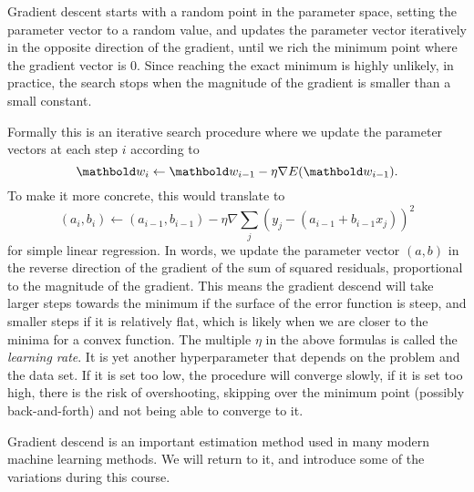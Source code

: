 Gradient descent starts with a random point in the parameter space,
setting the parameter vector to a random value,
and updates the parameter vector iteratively 
in the opposite direction of the gradient,
until we rich the minimum point where the gradient vector is \num{0}.
Since reaching the exact minimum is highly unlikely,
in practice, the search stops when the magnitude of the gradient is 
smaller than a small constant.

Formally this is an iterative search procedure where
we update the parameter vectors at each step $i$ according to 
\begin{equation}
  \vect{w_{i}} \leftarrow \vect{w}_{i-1} - \eta \nabla{}E(\vect{w}_{i-1}) .
\end{equation}
To make it more concrete, this would translate to 
\begin{equation*}
  (a_{i}, b_{i}) \leftarrow (a_{i-1}, b_{i-1}) - \eta \nabla{} \sum_{j} \left(y_{j} - (a_{i-1} + b_{i-1} x_{j})\right)^{2}
\end{equation*}
for simple linear regression.%
In words, we update the parameter vector $(a, b)$
in the reverse direction of the gradient of the sum of squared residuals,
proportional to the magnitude of the gradient.
This means the gradient descend will take larger steps
towards the minimum if the surface of the error function is steep,
and smaller steps if it is relatively flat,
which is likely when we are closer to the minima for a convex function.
The multiple $\eta$ in the above formulas is called the \emph{learning rate}.
It is yet another hyperparameter that depends on the problem and the data set.
If it is set too low, the procedure will converge slowly,
if it is set too high, there is the risk of overshooting,
skipping over the minimum point (possibly back-and-forth)
and not being able to converge to it.%

Gradient descend is an important estimation method
used in many modern machine learning methods.
We will return to it, and introduce some of the variations during this course.

